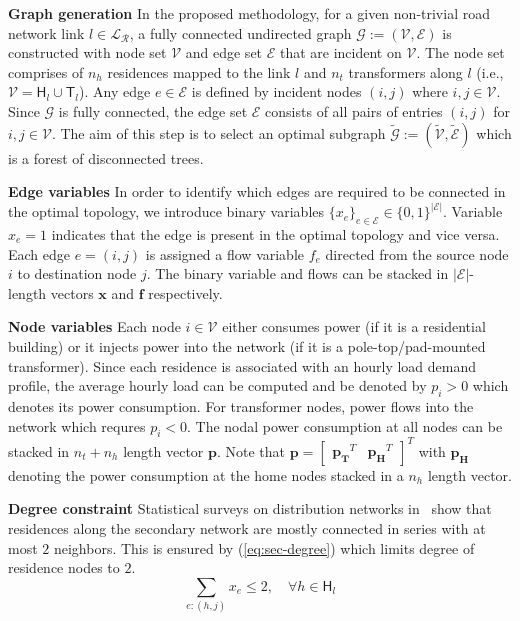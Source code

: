 \documentclass[sigconf]{acmart}
\begin{document}
\noindent\textbf{Graph generation}
In the proposed methodology, for a given non-trivial road network link $l\in\mathcal{L_R}$, a fully connected undirected graph $\mathcal{G}:=(\mathcal{V},\mathcal{E})$ is constructed with node set $\mathcal{V}$ and edge set $\mathcal{E}$ that are incident on $\mathcal{V}$. The node set comprises of $n_h$ residences mapped to the link $l$ and $n_t$ transformers along $l$ (i.e.,$\mathcal{V}=\mathsf{H}_l\cup\mathsf{T}_l$). Any edge $e\in\mathcal{E}$ is defined by incident nodes $(i,j)$ where $i,j\in\mathcal{V}$. Since $\mathcal{G}$ is fully connected, the edge set $\mathcal{E}$ consists of all pairs of entries $(i,j)$ for $i,j\in\mathcal{V}$. The aim of this step is to select an optimal subgraph $\tilde{\mathcal{G}}:=(\tilde{\mathcal{V}},\tilde{\mathcal{E}})$ which is a forest of disconnected trees.

\noindent\textbf{Edge variables} In order to identify which edges are required to be connected in the optimal topology, we introduce binary variables $\{x_e\}_{e\in\mathcal{E}}\in\{0,1\}^{|\mathcal{E}|}$. Variable $x_e=1$ indicates that the edge is present in the optimal topology and vice versa.
Each edge $e=(i,j)$ is assigned a flow variable $f_e$ directed from the source node $i$ to destination node $j$. The binary variable and flows can be stacked in $|\mathcal{E}|$-length vectors $\mathbf{x}$ and $\mathbf{f}$ respectively.

\noindent\textbf{Node variables} Each node $i\in\mathcal{V}$ either consumes power (if it is a residential building) or it injects power into the network (if it is a pole-top/pad-mounted transformer). Since each residence is associated with an hourly load demand profile, the average hourly load can be computed and be denoted by $p_i>0$ which denotes its power consumption. For transformer nodes, power flows into the network which requres $p_i<0$. The nodal power consumption at all nodes can be stacked in $n_t+n_h$ length vector $\mathbf{p}$. Note that $\mathbf{p}=\begin{bmatrix}\mathbf{p_T}^T &\mathbf{p_H}^T\end{bmatrix}^T$ with $\mathbf{p_H}$ denoting the power consumption at the home nodes stacked in a $n_h$ length vector.

\noindent\textbf{Degree constraint} Statistical surveys on distribution networks in~\cite{mv_2011} show that residences along the secondary network are mostly connected in series with at most $2$ neighbors. This is ensured by (\ref{eq:sec-degree}) which limits degree of residence nodes to $2$.
\begin{equation}
\sum_{e:(h,j)}x_{e}\leq 2,\quad \forall h\in\mathsf{H}_{l}\label{eq:sec-degree}
\end{equation}
\end{document}
